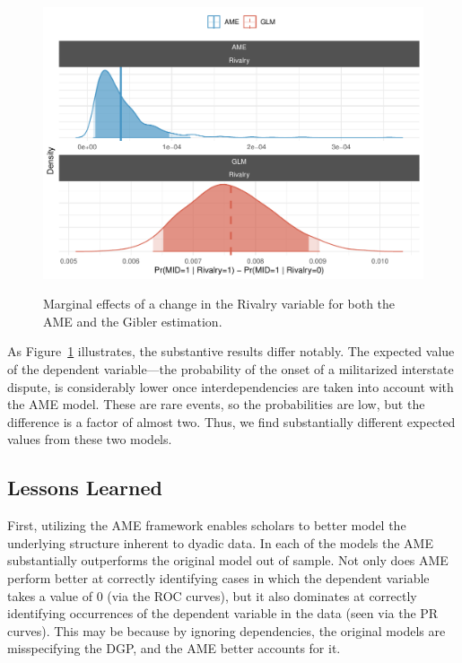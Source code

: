 \begin{figure}
	\caption{Marginal effects of a change in the Rivalry variable for both the AME and the Gibler estimation.  \label{fig:gibmargeff}}
	\includegraphics[width=\textwidth]{graphics/figure9.pdf}
 	\label{fig:gibmargeff}
 \end{figure}

As Figure~\ref{fig:gibmargeff} illustrates, the substantive results differ notably. The expected value of the dependent variable---the probability of the onset of a militarized interstate dispute, is considerably lower once interdependencies are taken into account with the AME model.  These are rare events, so the probabilities are low, but the difference is a factor of almost two. Thus, we find substantially different expected values from these two models.

\subsection{Lessons Learned}

First, utilizing the AME framework enables scholars to better model the underlying structure inherent to dyadic data. In each of the models the AME substantially outperforms the original model out of sample. Not only does AME perform better at correctly identifying cases in which the dependent variable takes a value of $0$ (via the ROC curves), but it also dominates at correctly identifying occurrences of the dependent variable in the data (seen via the PR curves). This may be because by ignoring dependencies, the original models are misspecifying the DGP, and the AME better accounts for it.

